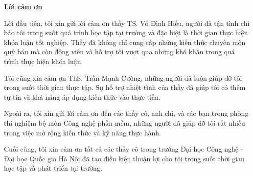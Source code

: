 \begin{center}
\textbf{\large{Lời cảm ơn}	}
\end{center}

Lời đầu tiên, tôi xin gửi lời cảm ơn thầy TS. Võ Đình Hiếu, người đã tận tình
chỉ bảo tôi trong suốt quá trình học tập tại trường và đặc biệt là thời gian thực hiện khóa luận tốt nghiệp. Thầy đã không chỉ cung cấp những kiến thức chuyên môn quý báu mà còn động viên và hỗ trợ tôi vượt qua những khó khăn trong quá trình thực hiện khóa luận.
 
Tôi cũng xin cảm ơn ThS. Trần Mạnh Cường, những người đã luôn giúp đỡ tôi trong suốt thời gian thực tập. Sự hỗ trợ nhiệt tình của thầy đã giúp tôi có thêm tự tin và khả năng áp dụng kiến thức vào thực tiễn.

Ngoài ra, tôi xin gửi lời cảm ơn đến các thầy cô, anh chị, và các bạn trong phòng thí nghiệm bộ môn Công nghệ phần mềm, những người đã giúp đỡ tôi rất nhiều trong việc mở rộng kiến thức và kỹ năng thực hành.

Cuối cùng, tôi xin cảm ơn tất cả các thầy cô trong trường Đại học Công nghệ -
Đại học Quốc gia Hà Nội đã tạo điều kiện thuận lợi cho tôi trong suốt thời gian
học tập và phát triển tại trường.

